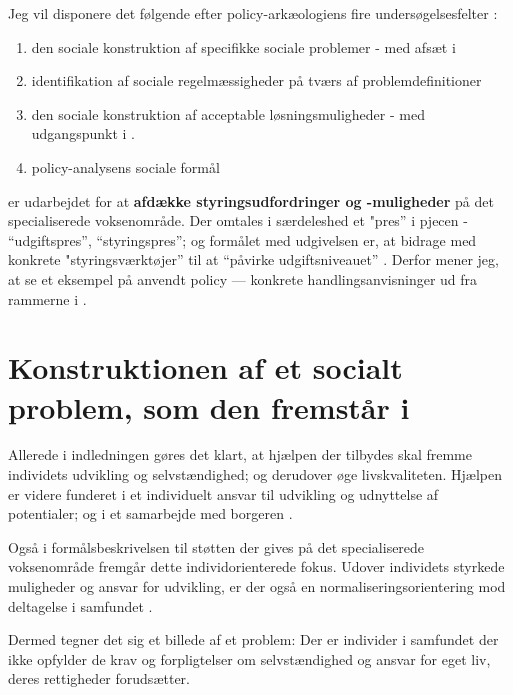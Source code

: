 Jeg vil disponere det følgende efter policy-arkæologiens fire undersøgelsesfelter \autocite[s. 300]{scheurichPolicyArchaeologyNew1994}:
\begin{enumerate}
  \item
    den sociale konstruktion af specifikke sociale problemer - med afsæt i 
  \item
    identifikation af sociale regelmæssigheder på tværs af problemdefinitioner
  \item
    den sociale konstruktion af acceptable løsningsmuligheder - med udgangspunkt i .
  \item
    policy-analysens sociale formål
\end{enumerate}

 er udarbejdet for at \textbf{afdække styringsudfordringer og -muligheder} på det specialiserede voksenområde.
Der omtales i særdeleshed et "pres” i pjecen - “udgiftspres”, “styringspres”; og formålet med udgivelsen er, at bidrage med konkrete "styringsværktøjer” til at “påvirke udgiftsniveauet” \autocite[s. 2, 3. m.fl.]{klStyringAfDet2017}.
Derfor mener jeg, at se et eksempel på anvendt policy — konkrete handlingsanvisninger ud fra rammerne i .

\section{Konstruktionen af et socialt problem, som den fremstår i }

Allerede i indledningen gøres det klart, at hjælpen der tilbydes skal fremme individets udvikling og selvstændighed; og derudover øge livskvaliteten.
Hjælpen er videre funderet i et individuelt ansvar til udvikling og udnyttelse af potentialer; og i et samarbejde med borgeren \autocite[§§ 2-3]{social-ogindenrigsministerietBekendtgorelseAfLov2019}.

Også i formålsbeskrivelsen til støtten der gives på det specialiserede voksenområde fremgår  dette individorienterede fokus.
Udover individets styrkede muligheder og ansvar for udvikling, er der også en normaliseringsorientering mod deltagelse i samfundet \autocite[§ 81]{social-ogindenrigsministerietBekendtgorelseAfLov2019}.

Dermed tegner det sig et billede af et problem: Der er individer i samfundet der ikke opfylder de krav og forpligtelser om selvstændighed og ansvar for eget liv, deres rettigheder forudsætter.

